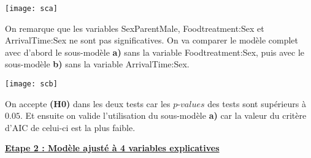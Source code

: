 \documentclass[11pt,fleqn]{book} %
\begin{document}
\vspace{2em}


\vspace{2em}

\texttt{[image: sca]}

\vspace{1em}

On remarque que les variables SexParentMale, Foodtreatment:Sex et ArrivalTime:Sex ne sont pas significatives. On va comparer le modèle complet avec d'abord le sous-modèle \textbf{a)} sans la variable Foodtreatment:Sex, puis avec le sous-modèle  \textbf{b)} sans la variable ArrivalTime:Sex. 

\vspace{2em}


\vspace{2em}

\texttt{[image: scb]}

\vspace{1em}

On accepte \textbf{(H0)} dans les deux tests car les $p$-$values$ des tests sont supérieurs à $0.05$. Et ensuite on valide l'utilisation du sous-modèle \textbf{a)} car la valeur du critère d'AIC de celui-ci est la plus faible.

\vspace{1em}

\underline{\textbf{Etape 2 : Modèle ajusté à 4 variables explicatives}}

\vspace{2em}
\end{document}
